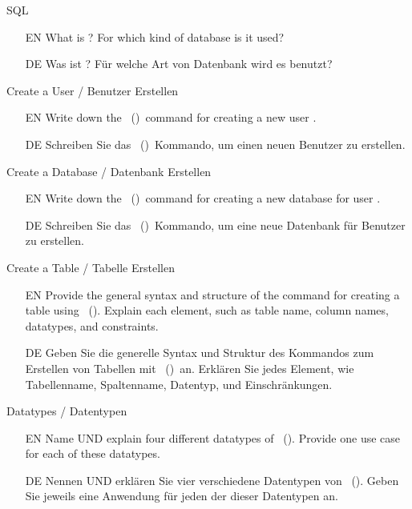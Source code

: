 %
%
\gdef\sqlDialect{\glsShort{SQL}~(\postgresql)}%
%
\begin{question}{SQL}%
\begin{itemize}%
\item[EN] What is ? %
For which kind of database is it used?%
\item[DE] Was ist ? %
Für welche Art von Datenbank wird es benutzt?
\end{itemize}%
\end{question}%
%
\begin{question}{Create a User / Benutzer Erstellen}%
\begin{itemize}%
\item[EN] Write down the \sqlDialect\ command for creating a new user .%
\item[DE] Schreiben Sie das \sqlDialect\ Kommando, um einen neuen Benutzer  zu erstellen.%
\end{itemize}%
\end{question}%
%
\begin{question}{Create a Database / Datenbank Erstellen}%
\begin{itemize}%
\item[EN] Write down the \sqlDialect\  command for creating a new database  for user .%
\item[DE] Schreiben Sie das \sqlDialect\ Kommando, um eine neue Datenbank  für Benutzer  zu erstellen.%
\end{itemize}%
\end{question}%
%
%
\begin{question}{Create a Table / Tabelle Erstellen}%
\begin{itemize}%
\item[EN] Provide the general syntax and structure of the command for creating a table using \sqlDialect. %
Explain each element, such as table name, column names, datatypes, and constraints.%
\item[DE] Geben Sie die generelle Syntax und Struktur des Kommandos zum Erstellen von Tabellen mit \sqlDialect\ an. %
Erklären Sie jedes Element, wie Tabellenname, Spaltenname, Datentyp, und Einschränkungen.%
\end{itemize}%
\end{question}%
%
%
\begin{question}{Datatypes / Datentypen}%
\begin{itemize}%
\item[EN] Name UND explain four different datatypes of \sqlDialect. %
Provide one use case for each of these datatypes.%
\item[DE] Nennen UND erklären Sie vier verschiedene Datentypen von \sqlDialect. %
Geben Sie jeweils eine Anwendung für jeden der dieser Datentypen an.%
\end{itemize}%
\end{question}%
